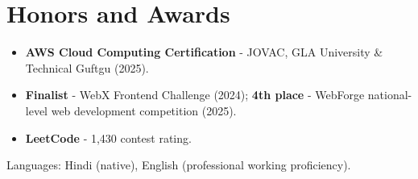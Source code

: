 \documentclass[11pt,a4paper,sans]{moderncv}
\begin{document}

\enlargethispage{4\baselineskip}
\section{Honors and Awards}
\vspace{1pt}
\begin{itemize}
    \item {\textbf{AWS Cloud Computing Certification} - JOVAC, GLA University \& Technical Guftgu (2025).}
    \item {\textbf{Finalist} - WebX Frontend Challenge (2024); \textbf{4th place} - WebForge national-level web development competition (2025).}
    \item {\textbf{LeetCode} - 1,430 contest rating.}
\end{itemize}


\vspace{2pt}
\small{Languages: Hindi (native), English (professional working proficiency).}
\end{document}
